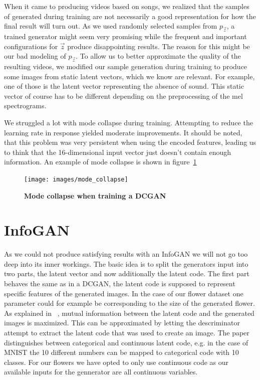             When it came to producing videos based on songs, we realized that the samples of generated during training are not necessarily a good representation for how the final result will turn out. As we used randomly selected samples from $p_{\vec{z}}$, a trained generator might seem very promising while the frequent and important configurations for $\vec{z}$ produce disappointing results. The reason for this might be our bad modeling of $p_{\vec{z}}$. To allow us to better approximate the quality of the resulting videos, we modified our sample generation during training to produce some images from static latent vectors, which we know are relevant. For example, one of those is the latent vector representing the absence of sound. This static vector of course has to be different depending on the preprocessing of the mel spectrograms.

            We struggled a lot with mode collapse during training. Attempting to reduce the learning rate in response yielded moderate improvements. It should be noted, that this problem was very persistent when using the encoded features, leading us to think that the 16-dimensional input vector just doesn't contain enough information. An example of mode collapse is shown in figure~\ref{fig:mode_collapse}

            \begin{figure}[ht]
                \centering
                \texttt{[image: images/mode\_collapse]}
                \caption[DCGAN mode collapse]
                {
                    \textbf{Mode collapse when training a DCGAN}
                }
                \label{fig:mode_collapse}
            \end{figure}

    \section{InfoGAN}
        
        As we could not produce satisfying results with an InfoGAN we will not go too deep into its inner workings. The basic idea is to split the generators input into two parts, the latent vector and now additionally the latent code. The first part behaves the same as in a DCGAN, the latent code is supposed to represent specific features of the generated images. In the case of our flower dataset one parameter could for example be corresponding to the size of the generated flower. As explained in ~\cite{infogan}, mutual information between the latent code and the generated images is maximized. This can be approximated by letting the descriminator attempt to extract the latent code that was used to create an image. The paper distinguishes between categorical and continuous latent code, e.g. in the case of MNIST the 10 different numbers can be mapped to categorical code with 10 classes. For our flowers we have opted to only use continuous code as our available inputs for the gennerator are all continuous variables.

